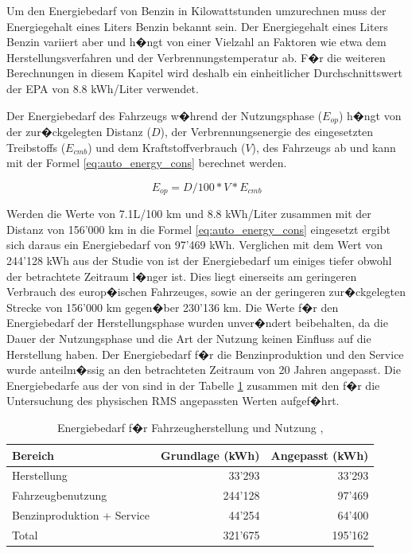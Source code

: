 \documentclass[a4paper,twoside,10pt]{report}
\begin{document}
Um den Energiebedarf von Benzin in Kilowattstunden umzurechnen muss der Energiegehalt eines Liters Benzin bekannt sein. Der Energiegehalt eines Liters Benzin variiert aber und h�ngt von einer Vielzahl an Faktoren wie etwa dem Herstellungsverfahren und der Verbrennungstemperatur ab. F�r die weiteren Berechnungen in diesem Kapitel wird deshalb ein einheitlicher Durchschnittswert der \ac{EPA} von 8.8 kWh/Liter verwendet.\cite{fuel_energy}

Der Energiebedarf des Fahrzeugs w�hrend der Nutzungsphase ($E_{op}$) h�ngt von der zur�ckgelegten Distanz ($D$), der Verbrennungsenergie des eingesetzten Treibstoffs ($E_{cmb}$) und dem Kraftstoffverbrauch ($V$), des Fahrzeugs ab und kann mit der Formel \ref{eq:auto_energy_cons} berechnet werden. \cite{auto_lca}

\begin{equation}
E_{op} = D / 100 * V * E_{cmb}
\label{eq:auto_energy_cons}
\end{equation}

Werden die Werte von 7.1L/100 km und 8.8 kWh/Liter zusammen mit der Distanz von 156'000 km in die Formel \ref{eq:auto_energy_cons} eingesetzt ergibt sich daraus ein Energiebedarf von 97'469 kWh. Verglichen mit dem Wert von 244'128 kWh aus der Studie von \citeauthor{auto_lca} ist der Energiebedarf um einiges tiefer obwohl der betrachtete Zeitraum l�nger ist. Dies liegt einerseits am geringeren Verbrauch des europ�ischen Fahrzeuges, sowie an der geringeren zur�ckgelegten Strecke von 156'000 km gegen�ber 230'136 km. Die Werte f�r den Energiebedarf der Herstellungsphase wurden unver�ndert beibehalten, da die Dauer der Nutzungsphase und die Art der Nutzung keinen Einfluss auf die Herstellung haben. Der Energiebedarf f�r die Benzinproduktion und den Service wurde anteilm�ssig an den betrachteten Zeitraum von 20 Jahren angepasst. Die Energiebedarfe aus der von \citeauthor{auto_lca} sind in der Tabelle \ref{tab:ges_energ_auto} zusammen mit den f�r die Untersuchung des physischen \ac{RMS} angepassten Werten aufgef�hrt. \cite{auto_lca} 

\begin{table} [h]
	\begin{tabular}{l|r|r}
	\hline
	\textbf{Bereich} & \textbf{Grundlage (kWh)} & \textbf{Angepasst (kWh)} \\
	\hline
	Herstellung & 33'293 & 33'293 \\
	Fahrzeugbenutzung &	244'128 & 97'469 \\
	Benzinproduktion + Service & 44'254 & 64'400 \\
	\hline
	\hline
	Total  & 321'675 & 195'162 \\
	\hline
	\end{tabular}
\caption{Energiebedarf f�r Fahrzeugherstellung und Nutzung \cite{auto_lca},\cite{auto_lca_2}} 
\label{tab:ges_energ_auto}
\end{table}
\end{document}
